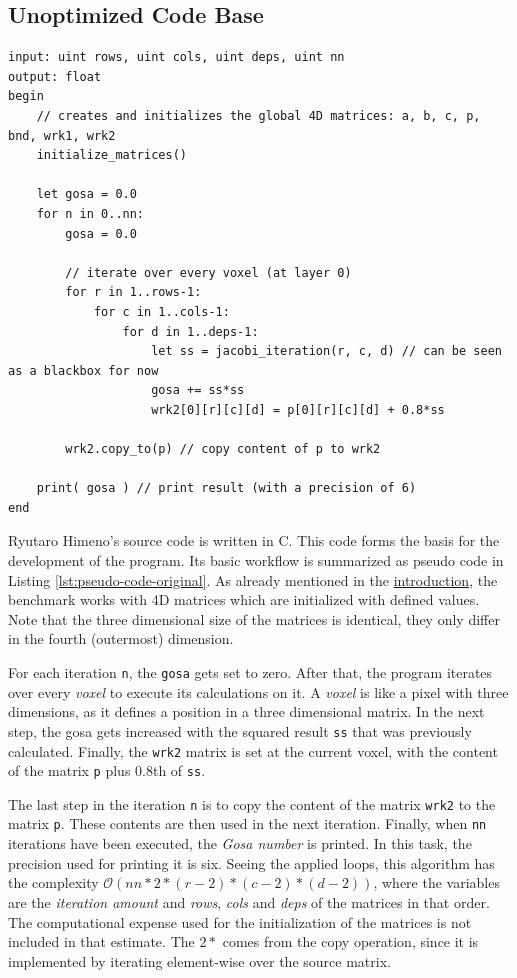 \subsection{Unoptimized Code Base}
\label{ssec:code-base}

\begin{lstlisting}[caption={Simplified Pseudo Code of the unoptimized Algorithm}, label={lst:pseudo-code-original}, captionpos=b, frame=tb, float]
input: uint rows, uint cols, uint deps, uint nn
output: float
begin
    // creates and initializes the global 4D matrices: a, b, c, p, bnd, wrk1, wrk2
    initialize_matrices()
    
    let gosa = 0.0
    for n in 0..nn:
        gosa = 0.0
    
        // iterate over every voxel (at layer 0)
        for r in 1..rows-1:
            for c in 1..cols-1:
                for d in 1..deps-1:
                    let ss = jacobi_iteration(r, c, d) // can be seen as a blackbox for now
                    gosa += ss*ss
                    wrk2[0][r][c][d] = p[0][r][c][d] + 0.8*ss
                    
        wrk2.copy_to(p) // copy content of p to wrk2
    
    print( gosa ) // print result (with a precision of 6)
end
\end{lstlisting}

Ryutaro Himeno's source code is written in C. This code forms the basis for the development of the program. Its basic workflow is summarized as pseudo code in Listing \ref{lst:pseudo-code-original}. As already mentioned in the \hyperref[sec:introduction]{introduction}, the benchmark works with 4D matrices which are initialized with defined values. Note that the three dimensional size of the matrices is identical, they only differ in the fourth (outermost) dimension.

For each iteration \verb+n+, the \verb+gosa+ gets set to zero. After that, the program iterates over every \textit{voxel} to execute its calculations on it. A \textit{voxel} is like a pixel with three dimensions, as it defines a position in a three dimensional matrix. In the next step, the gosa gets increased with the squared result \verb+ss+ that was previously calculated. Finally, the \verb+wrk2+ matrix is set at the current voxel, with the content of the matrix \verb+p+ plus 0.8th of \verb+ss+.

The last step in the iteration \verb+n+ is to copy the content of the matrix \verb+wrk2+ to the matrix \verb+p+. These contents are then used in the next iteration. Finally, when \verb+nn+ iterations have been executed, the \textit{Gosa number} is printed. In this task, the precision used for printing it is six. Seeing the applied loops, this algorithm has the complexity $\mathcal{O}(nn*2*(r-2)*(c-2)*(d-2))$, where the variables are the \textit{iteration amount} and \textit{rows}, \textit{cols} and \textit{deps} of the matrices in that order. The computational expense used for the initialization of the matrices is not included in that estimate. The $2*$ comes from the copy operation, since it is implemented by iterating element-wise over the source matrix.


